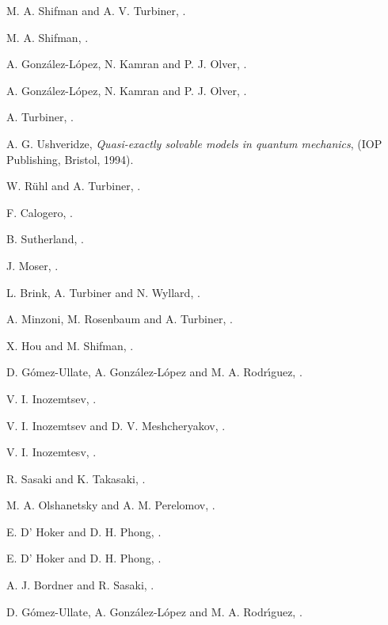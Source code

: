 \documentclass[a4paper,preprint,amsfonts,amssymb,amsmath,%
tightenlines,nofootinbib,noshowpacs]{revtex4}
\begin{document}
\begin{thebibliography}{99}
M. A. Shifman and A. V. Turbiner,
.

M. A. Shifman,
.

A. Gonz{\'{a}}lez-L{\'{o}}pez, N. Kamran and P. J. Olver,
.

A. Gonz{\'{a}}lez-L{\'{o}}pez, N. Kamran and P. J. Olver,
.

A. Turbiner,
.

A. G. Ushveridze,
\textit{Quasi-exactly solvable models in quantum mechanics},
(IOP Publishing, Bristol, 1994).

W. R{\"{u}}hl and A. Turbiner,
.

F. Calogero,
.

B. Sutherland,
.

J. Moser,
.

L. Brink, A. Turbiner and N. Wyllard,
.

A. Minzoni, M. Rosenbaum and A. Turbiner,
.

X. Hou and M. Shifman,
.

D. G{\'{o}}mez-Ullate, A. Gonz{\'{a}}lez-L{\'{o}}pez
and M. A. Rodr{\'{\i}}guez,
.

V. I. Inozemtsev,
.

V. I. Inozemtsev and D. V. Meshcheryakov,
.

V. I. Inozemtesv,
.

R. Sasaki and K. Takasaki,
.

M. A. Olshanetsky and A. M. Perelomov,
.

E. D' Hoker and D. H. Phong,
.

E. D' Hoker and D. H. Phong,
.

A. J. Bordner and R. Sasaki,
.

D. G{\'{o}}mez-Ullate, A. Gonz{\'{a}}lez-L{\'{o}}pez
and M. A. Rodr{\'{\i}}guez,
.

\end{thebibliography}
\end{document}
